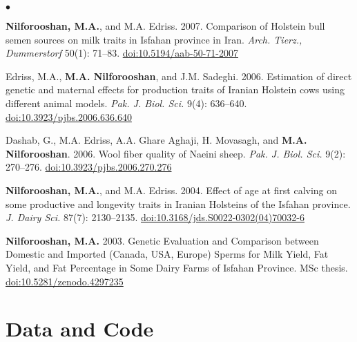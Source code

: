 \documentclass[margin,line]{res}
\newenvironment{list2}{
  \begin{list}{$\bullet$}{%
      \setlength{\itemsep}{0in}
      \setlength{\parsep}{0in} \setlength{\parskip}{0in}
      \setlength{\topsep}{0in} \setlength{\partopsep}{0in}
      \setlength{\leftmargin}{0.2in}}}{\end{list}}
\begin{document}
\begin{resume}
\begin{list2}
\item {\bf Nilforooshan, M.A.}, and M.A. Edriss. 2007. Comparison of Holstein bull semen sources on milk traits in Isfahan province in Iran. {\em Arch. Tierz., Dummerstorf} 50(1): 71--83. \href{https://doi.org/10.5194/aab-50-71-2007}{doi:10.5194/aab-50-71-2007}
\item Edriss, M.A., {\bf M.A. Nilforooshan}, and J.M. Sadeghi. 2006. Estimation of direct genetic and maternal effects for production traits of Iranian Holstein cows using different animal models. {\em Pak. J. Biol. Sci.} 9(4): 636--640. \href{https://doi.org/10.3923/pjbs.2006.636.640}{doi:10.3923/pjbs.2006.636.640}
\item Dashab, G., M.A. Edriss, A.A. Ghare Aghaji, H. Movasagh, and {\bf M.A. Nilforooshan}. 2006. Wool fiber quality of Naeini sheep. {\em Pak. J. Biol. Sci.} 9(2): 270--276. \href{https://doi.org/10.3923/pjbs.2006.270.276}{doi:10.3923/pjbs.2006.270.276}
\item {\bf Nilforooshan, M.A.}, and M.A. Edriss. 2004. Effect of age at first calving on some productive and longevity traits in Iranian Holsteins of the Isfahan province. {\em J. Dairy Sci.} 87(7): 2130--2135. \href{https://doi.org/10.3168/jds.S0022-0302(04)70032-6}{doi:10.3168/jds.S0022-0302(04)70032-6}
\item {\bf Nilforooshan, M.A.} 2003. Genetic Evaluation and Comparison between Domestic and Imported (Canada, USA, Europe) Sperms for Milk Yield, Fat Yield, and Fat Percentage in Some Dairy Farms of Isfahan Province. MSc thesis. \href{https://doi.org/10.5281/zenodo.4297235}{doi:10.5281/zenodo.4297235}
\end{list2}
\section{\sc Data and Code}


\end{resume}
\end{document}
